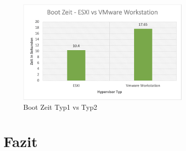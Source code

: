 \documentclass[conference]{IEEEtran}
\begin{document}
\begin{figure}[!h]
	\centering
	\includegraphics[keepaspectratio,width=8.5cm,height=0.75\textheight]{bootzeit.png}
	\caption{Boot Zeit Typ1 vs Typ2}
	\label{architecture}
\end{figure}

\section{Fazit}
\label{Fazit}
\end{document}
